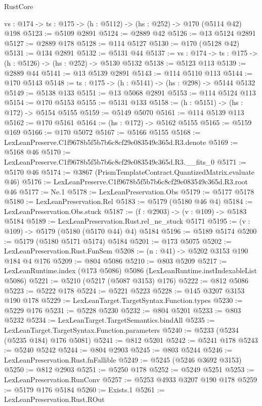 \begin{lexlean}{RustCore}
\begin{coremodule}
  {vs : @174} -> {ts : @175} -> (h : @5112) -> (hs : @252) -> @170 (@5114 @42) @198
@5123 := @5109 @2891
@5124 := @2889 @42
@5126 := @13 @5124 @2891
@5127 := @2889 @178
@5128 := @114 @5127
@5130 := @170 (@5128 @42)
@5131 := @134 @2891
@5132 := @5131 @44
@5137 := {vs : @174} -> {ts : @175} -> (h : @5126) -> (hs : @252) -> @5130 @5132
@5138 := @5123 @113
@5139 := @2889 @44
@5141 := @13 @5139 @2891
@5143 := @114 @5110 @113
@5144 := @170 @5143
@5148 := {ts : @175} -> (h : @5141) -> (hs : @298) -> @5144 @5132
@5149 := @5138 @133
@5151 := @13 @5068 @2891
@5153 := @114 @5124 @113
@5154 := @170 @5153
@5155 := @5131 @133
@5158 := (h : @5151) -> (hs : @172) -> @5154 @5155
@5159 := @5149 @5070
@5161 := @114 @5139 @113
@5162 := @170 @5161
@5164 := (hs : @172) -> @5162 @5155
@5165 := @5159 @169
@5166 := @170 @5072
@5167 := @5166 @5155
@5168 := LexLeanPreserve.C1f9678b5f5b7b6c8cf29e083549c365d.R3.denote
@5169 := @5168 @46
@5170 := LexLeanPreserve.C1f9678b5f5b7b6c8cf29e083549c365d.R3.__fits_0
@5171 := @5170 @46
@5174 := @3867 (PrismTemplateContract.QuantizedMatrix.evaluate @46)
@5176 := LexLeanPreserve.C1f9678b5f5b7b6c8cf29e083549c365d.R3.root @46
@5177 := Ne.{1}
@5178 := LexLeanPreservation.Obs
@5179 := @5177 @5178
@5180 := LexLeanPreservation.Rel
@5183 := @5179 (@5180 @46 @4)
@5184 := LexLeanPreservation.Obs.stuck
@5187 := (f : @2903) -> (v : @109) -> @5183 @5184
@5189 := LexLeanPreservation.Rust.rel_ne_stuck @5171
@5195 := (v : @109) -> @5179 (@5180 (@5170 @44) @4) @5184
@5196 := @5189 @5174
@5200 := @5179 (@5180 @5171 @5174) @5184
@5201 := @173 @5075
@5202 := LexLeanPreservation.Rust.FunSem
@5208 := (n : @41) -> @5202 @3153 @190 @184 @4 @176
@5209 := @804 @5086
@5210 := @803 @5209
@5217 := LexLeanRuntime.index (@173 @5086) @5086 (LexLeanRuntime.instIndexableList @5086)
@5221 := @5210 (@5217 (@5087 @3153) @176)
@5222 := @812 @5086
@5223 := @5222 @178
@5224 := @5221 @5223
@5228 := @145 @3207 @3153 @190 @178
@5229 := LexLeanTarget.TargetSyntax.Function.types
@5230 := @5229 @176
@5231 := @5228 @5230
@5232 := @804 @5201
@5233 := @803 @5232
@5234 := LexLeanTarget.TargetSemantics.bindAll
@5235 := LexLeanTarget.TargetSyntax.Function.parameters
@5240 := @5233 (@5234 (@5235 @184) @176 @5081)
@5241 := @812 @5201
@5242 := @5241 @178
@5243 := @5240 @5242
@5244 := @804 @2903
@5245 := @803 @5244
@5246 := LexLeanPreservation.Rust.fnFallible
@5249 := @5245 (@5246 @3692 @3153)
@5250 := @812 @2903
@5251 := @5250 @178
@5252 := @5249 @5251
@5253 := LexLeanPreservation.RunConv
@5257 := @5253 @4933 @3207 @190 @178
@5259 := @5179 @176 @5184
@5260 := Exists.{1}
@5261 := LexLeanPreservation.Rust.ROut

\end{coremodule}
\end{lexlean}
